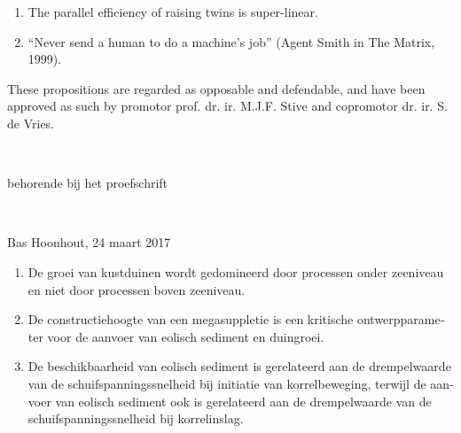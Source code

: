 \documentclass[headinclude,footinclude,cleardoublepage=empty,
numbers=noenddot,fontsize=9pt]{scrbook}
\begin{document}
\begin{titlepage}
\begin{enumerate}
  \item The parallel efficiency of raising twins is super-linear.
    
  \item ``Never send a human to do a machine's job'' (Agent Smith in
    The Matrix, 1999).

  \end{enumerate}

  \vfill

  \noindent These propositions are regarded as opposable and
  defendable, and have been approved as such by promotor
  prof. dr. ir. M.J.F. Stive and copromotor dr. ir. S. de Vries.

  \newpage

  \begin{otherlanguage}{dutch}
    \thispagestyle{empty}

    \begin{center}
      \hfill
      \vfill
    
      \begingroup
      \color{Maroon} \\ \bigskip
      \endgroup
      
      behorende bij het proefschrift \\ \bigskip
      
      \begingroup
      \color{Maroon} \\ \bigskip
      \endgroup
      
      Bas Hoonhout, 24 maart 2017
    \end{center}  
    
    \vfill
    
    \begin{enumerate}
      
    \item De groei van kustduinen wordt gedomineerd door processen
      onder zeeniveau en niet door processen boven zeeniveau.
      
    \item De constructiehoogte van een megasuppletie is een kritische
      ontwerpparameter voor de aanvoer van eolisch sediment en
      duingroei.
      
    \item De beschikbaarheid van eolisch sediment is gerelateerd aan
      de drempelwaarde van de schuifspanningssnelheid bij initiatie
      van korrelbeweging, terwijl de aanvoer van eolisch sediment ook
      is gerelateerd aan de drempelwaarde van de
      schuifspanningssnelheid bij korrelinslag.
      

\end{enumerate}
\end{otherlanguage}
\end{titlepage}
\end{document}
